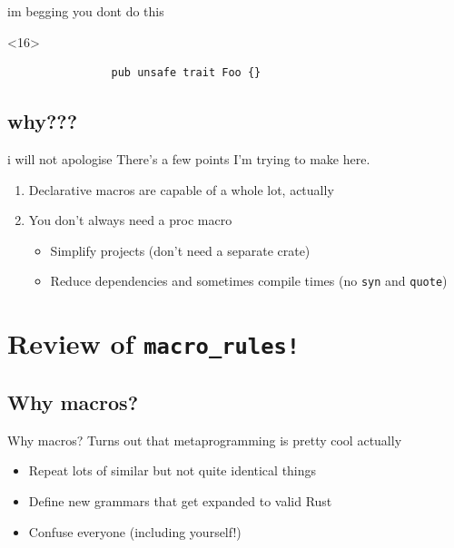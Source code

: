 \documentclass{beamer}
\begin{document}
\begin{frame}[fragile]{im begging you dont do this}
		\pause

		\begin{onlyenv}<16>
			\begin{verbatim}
				pub unsafe trait Foo {}
			\end{verbatim}
		\end{onlyenv}
	\end{frame}

	\subsection{why???}
	\begin{frame}{i will not apologise}
		There's a few points I'm trying to make here.

		\pause

		\begin{enumerate}
			\item Declarative macros are capable of a whole lot, actually

			\pause

			\item You don't always need a proc macro
			\begin{itemize}
				\item Simplify projects (don't need a separate crate)
				\item Reduce dependencies and sometimes compile times (no \texttt{syn} and
					\texttt{quote})
			\end{itemize}
		\end{enumerate}
	\end{frame}

	\section[Review of macro\_rules!]{Review of {\color{macrorulescolor}\texttt{macro\_rules!}}}
	\subsection{Why macros?}
	\begin{frame}{Why macros?}
		Turns out that metaprogramming is pretty cool actually \\

		\begin{itemize}
			\item Repeat lots of similar but not quite identical things
			\pause
			\item Define new grammars that get expanded to valid Rust
			\pause
			\item Confuse everyone (including yourself!)
		\end{itemize}
	\end{frame}
\end{document}

